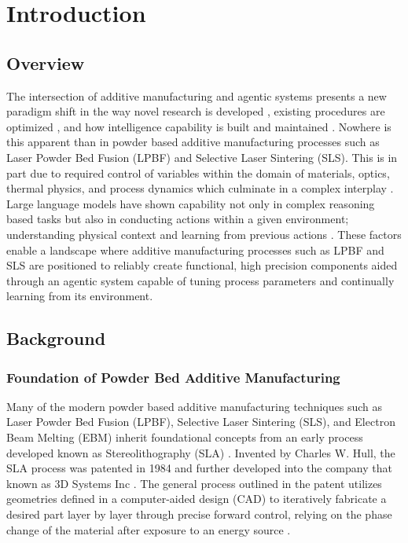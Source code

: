 \chapter{Introduction}


\section{Overview}
The intersection of additive manufacturing and agentic systems presents a new
paradigm shift in the way novel research is developed
\cite{pak_rocketsmith_2026}, existing procedures are optimized
\cite{jadhav_llm-3d_2025, pak_agentic_2026} , and how intelligence capability is
built and maintained \cite{pak_additivellm_2025, chandrasekhar_amgpt_2024}.
Nowhere is this apparent than in powder based additive manufacturing processes
such as Laser Powder Bed Fusion (LPBF) and Selective Laser Sintering (SLS). This
is in part due to required control of variables within the domain of materials,
optics, thermal physics, and process dynamics which culminate in a complex
interplay \cite{beaman_selective_1990, oneill_investigation_1999}. Large
language models have shown capability not only in complex reasoning based tasks
but also in conducting actions within a given environment; understanding
physical context and learning from previous actions
\cite{vaswani_attention_2023, nakano_webgpt_2022, yao_react_2022}. These factors
enable a landscape where additive manufacturing processes such as LPBF and SLS
are positioned to reliably create functional, high precision components aided
through an agentic system capable of tuning process parameters and continually
learning from its environment.

\section{Background}

\subsection{Foundation of Powder Bed Additive Manufacturing}

Many of the modern powder based additive manufacturing techniques such as Laser
Powder Bed Fusion (LPBF), Selective Laser Sintering (SLS), and Electron Beam
Melting (EBM) \cite{edwards_electron_2013, galati_literature_2018} inherit
foundational concepts from an early process developed known as Stereolithography
(SLA) \cite{hull_apparatus_1986, zakeri_comprehensive_2020}. Invented by Charles
W. Hull, the SLA process was patented in 1984 and further developed into the
company that known as 3D Systems Inc \cite{hull_apparatus_1986}. The general
process outlined in the patent utilizes geometries defined in a computer-aided
design (CAD) to iteratively fabricate a desired part layer by layer through
precise forward control, relying on the phase change of the material after
exposure to an energy source \cite{hull_apparatus_1986}.

